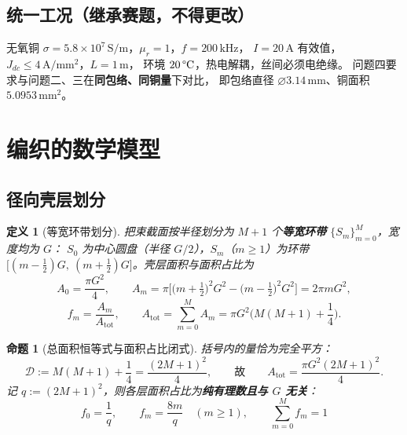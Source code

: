 \documentclass[12pt, a4paper]{ctexart}
\newtheorem{definition}{定义}[section]
\newtheorem{proposition}{命题}[section]
\newcommand{\U}[1]{\ensuremath{\,\mathrm{#1}}}
\newcommand{\Umm}{\ensuremath{\,\mathrm{mm}}}
\newcommand{\UdegC}{\ensuremath{\,\text{\textdegree}\mathrm{C}}}
\begin{document}
\subsection{统一工况（继承赛题，不得更改）}

无氧铜 $\sigma = 5.8\times10^{7}\U{S/m}$，$\mu_r=1$，$f = 200\U{kHz}$，
$I = 20\U{A}$ 有效值，$J_{dc}\le 4\U{A/mm^2}$，$L=1\U{m}$，
环境 $20\UdegC$，热电解耦，丝间必须电绝缘。
问题四要求与问题二、三在\textbf{同包络、同铜量}下对比，
即包络直径 $\varnothing 3.14\Umm$、铜面积 $5.0953\U{mm^2}$。

\section{编织的数学模型}

\subsection{径向壳层划分}

\begin{definition}[等宽环带划分]
把束截面按半径划分为 $M+1$ 个\textbf{等宽环带} $\{S_m\}_{m=0}^{M}$，宽度均为 $G$：
$S_0$ 为中心圆盘（半径 $G/2$），$S_m$（$m\ge1$）为环带
$\big[(m-\tfrac12)G,\ (m+\tfrac12)G\big]$。壳层面积与面积占比为
\begin{equation}
A_0 = \frac{\pi G^2}{4},\qquad
A_m = \pi\Big[\big(m+\tfrac12\big)^2G^2-\big(m-\tfrac12\big)^2G^2\Big] = 2\pi m G^2 ,
\end{equation}
\begin{equation}
f_m = \frac{A_m}{A_{\mathrm{tot}}},\qquad
A_{\mathrm{tot}} = \sum_{m=0}^{M} A_m = \pi G^2\Big(M(M+1)+\frac14\Big).
\label{eq:Atot}
\end{equation}
\end{definition}

\begin{proposition}[总面积恒等式与面积占比闭式]
\label{prop:Atot}
括号内的量恰为完全平方：
\begin{equation}
\mathcal{D} := M(M+1)+\frac14 = \frac{(2M+1)^2}{4},
\qquad\text{故}\qquad
A_{\mathrm{tot}} = \frac{\pi G^2 (2M+1)^2}{4}.
\end{equation}
记 $q := (2M+1)^2$，则各层面积占比为\textbf{纯有理数且与 $G$ 无关}：
\begin{equation}
\boxed{\;f_0 = \frac{1}{q},\qquad
f_m = \frac{8m}{q}\quad (m\ge1),\qquad \sum_{m=0}^{M}f_m = 1\;}
\label{eq:fm}
\end{equation}
\end{proposition}
\end{document}
